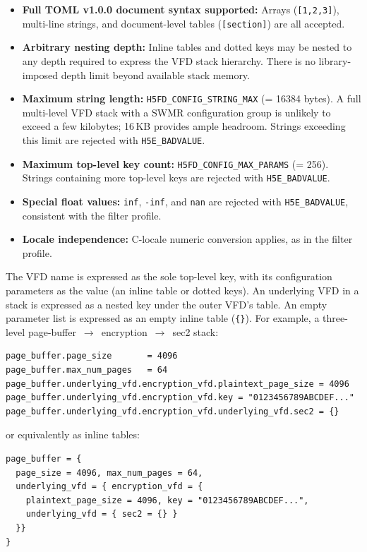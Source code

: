 \documentclass[../RFC-HDFG-2026-001.tex]{subfiles}
\begin{document}
\begin{itemize}
\item \textbf{Full TOML v1.0.0 document syntax supported:} Arrays
  (\texttt{[1,2,3]}), multi-line strings, and document-level tables
  (\texttt{[section]}) are all accepted.
\item \textbf{Arbitrary nesting depth:} Inline tables and dotted keys may be
  nested to any depth required to express the VFD stack hierarchy.  There is
  no library-imposed depth limit beyond available stack memory.
\item \textbf{Maximum string length:} \texttt{H5FD\_CONFIG\_STRING\_MAX} (=
  16384 bytes).  A full multi-level VFD stack with a SWMR configuration group
  is unlikely to exceed a few kilobytes; 16\,KB provides ample headroom.
  Strings exceeding this limit are rejected with \texttt{H5E\_BADVALUE}.
\item \textbf{Maximum top-level key count:} \texttt{H5FD\_CONFIG\_MAX\_PARAMS}
  (= 256).  Strings containing more top-level keys are rejected with
  \texttt{H5E\_BADVALUE}.
\item \textbf{Special float values:} \texttt{inf}, \texttt{-inf}, and
  \texttt{nan} are rejected with \texttt{H5E\_BADVALUE}, consistent with the
  filter profile.
\item \textbf{Locale independence:} C-locale numeric conversion applies, as
  in the filter profile.
\end{itemize}

The VFD name is expressed as the sole top-level key, with its configuration
parameters as the value (an inline table or dotted keys).  An underlying VFD
in a stack is expressed as a nested key under the outer VFD's table.  An
empty parameter list is expressed as an empty inline table (\texttt{\{\}}).
For example, a three-level page-buffer~$\to$~encryption~$\to$~sec2 stack:

\begin{verbatim}
page_buffer.page_size       = 4096
page_buffer.max_num_pages   = 64
page_buffer.underlying_vfd.encryption_vfd.plaintext_page_size = 4096
page_buffer.underlying_vfd.encryption_vfd.key = "0123456789ABCDEF..."
page_buffer.underlying_vfd.encryption_vfd.underlying_vfd.sec2 = {}
\end{verbatim}

or equivalently as inline tables:

\begin{verbatim}
page_buffer = {
  page_size = 4096, max_num_pages = 64,
  underlying_vfd = { encryption_vfd = {
    plaintext_page_size = 4096, key = "0123456789ABCDEF...",
    underlying_vfd = { sec2 = {} }
  }}
}
\end{verbatim}
\end{document}
